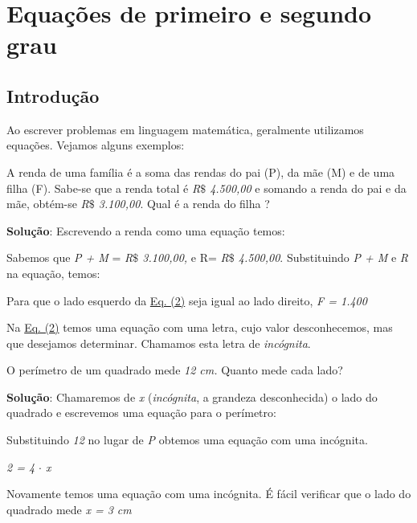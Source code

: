 \chapter{Equações de primeiro e segundo grau}

\section{Introdução}

Ao escrever problemas em linguagem matemática, geralmente utilizamos equações. Vejamos alguns exemplos:

\begin{texemplo}
A renda de uma família é a soma das rendas do pai (P), da mãe (M) e de uma filha (F). Sabe-se que a renda total é \textit{R$\$$  4.500,00} e somando a renda do pai e da mãe, obtém-se \textit{R$\$$  3.100,00}. Qual é a renda do filha ?

\textbf{Solução}: Escrevendo a renda como uma equação temos:


Sabemos que \textit{P + M} = \textit{R$\$$  3.100,00, }e R=\textit{ R$\$$  4.500,00}. Substituindo \textit{ P + M } e \textit{R} na equação, temos:


Para que o lado esquerdo da \hyperref[eqc:4.2]{Eq. (2)} seja igual ao lado direito, \textit{F = 1.400 }\qedsymbol{}
\end{texemplo}

Na \hyperref[eqc:4.2]{Eq. (2)} temos uma equação com uma letra, cujo valor desconhecemos, mas que desejamos determinar. Chamamos esta letra de \textit{incógnita}.

\begin{texemplo}
O perímetro de um quadrado mede \textit{12 cm. }Quanto mede cada lado?

\textbf{Solução}: Chamaremos de \textit{x} (\textit{incógnita}, a grandeza desconhecida) o lado do quadrado e escrevemos uma equação para o perímetro:


Substituindo \textit{12} no lugar de \textit{P} obtemos uma equação com uma incógnita.

\textit{2 = 4 $ \cdot $  x}

Novamente temos uma equação com uma incógnita. É fácil verificar que o lado do quadrado mede \textit{x = 3 cm} \qedsymbol{}

\end{texemplo}

